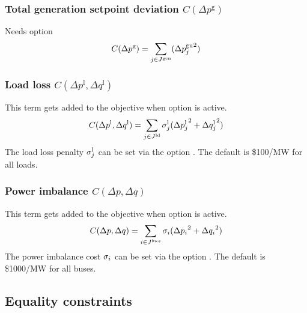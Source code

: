 \subsubsection{Total generation setpoint deviation $C(\Delta p^{\text{g}})$}
Needs \opflowoption{\opflowobjective}{\mingensetpointdeviation} option
\begin{equation}
C(\Delta p^{\text{g}}) = \sum_{j \in J^\text{gen}} ({\Delta{p}^\text{gu}_j}^2)
\label{eq:opf_obj_mingensetpointdev}
\end{equation}

\subsubsection{Load loss $C(\Delta p^{\text{l}},\Delta q^{\text{l}})$}
This term gets added to the objective when  \option{\opflowincludeloadloss} option is active. 
\begin{equation}
C(\Delta p^{\text{l}},\Delta q^{\text{l}}) =  \sum_{j \in J^\text{ld}} \sigma^\text{l}_j({\Delta{p}^{\text{l}}_j}^2 + {\Delta{q}^{\text{l}}_j}^2)
\label{eq:opf_obj_minloadloss}
\end{equation}
The load loss penalty $\sigma^\text{l}_j$ can be set via the option . The default is \$100/MW for all loads.

\subsubsection{Power imbalance $C(\Delta p,\Delta q)$}
This term gets added to the objective when   option is active. 
\begin{equation}
C(\Delta p,\Delta q) =  \sum_{i \in J^{bus}} \sigma_i({\Delta p_i}^2 + {\Delta q_i}^2)
\label{eq:opf_obj_minpowerimbalance}
\end{equation}
The power imbalance cost $\sigma_i$ can be set via the option . The default is \$1000/MW for all buses.

\subsection{Equality constraints}\label{sec:opflow_eq}

